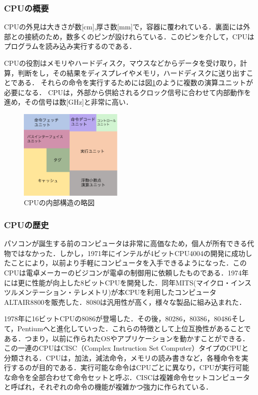 \documentclass[a4j,12pt]{jsarticle}
\begin{document}
\subsubsection{CPUの概要}
CPUの外見は大きさが数[cm],厚さ数[mm]で，容器に覆われている．裏面には外部との接続のため，数多くのピンが設けれらている．このピンを介して，CPUはプログラムを読み込み実行するのである．

CPUの役割はメモリやハードディスク，マウスなどからデータを受け取り，計算，判断をし，その結果をディスプレイやメモリ，ハードディスクに送り出すことである．
それらの命令を実行するためには図\ref{fig:cpu}のように複数の演算ユニットが必要になる．
CPUは，外部から供給されるクロック信号に合わせて内部動作を進め，その信号は数[GHz]と非常に高い．

\begin{figure}[htbp]
 \begin{center}
  \includegraphics[width=50mm]{CPU.pdf}
 \end{center}
 \caption{CPUの内部構造の略図}
 \label{fig:cpu}
\end{figure}

\subsubsection{CPUの歴史}
パソコンが誕生する前のコンピュータは非常に高価なため，個人が所有できる代物ではなかった．しかし，1971年にインテルが4ビットCPU4004の開発に成功したことにより，以前より手軽にコンピュータを入手できるようになった．このCPUは電卓メーカーのビジコンが電卓の制御用に依頼したものである．1974年には更に性能が向上した8ビットCPUを開発した．同年MITS(マイクロ・インスツルメンテーション・テレメトリ)が本CPUを利用したコンピュータALTAIR8800を販売した．8080は汎用性が高く，様々な製品に組み込まれた．

1978年に16ビットCPUの8086が登場した．その後，80286，80386，80486そして，Pentiumへと進化していった．これらの特徴として上位互換性があることである．つまり，以前に作られたOSやアプリケーションを動かすことができる．この一連のCPUはCISC（Complex Instruction Set Computer）タイプのCPUと分類される．CPUは，加法，減法命令，メモリの読み書きなど，各種命令を実行するのが目的である．実行可能な命令はCPUごとに異なり，CPUが実行可能な命令を全部合わせて命令セットと呼ぶ．CISCは複雑命令セットコンピュータと呼ばれ，それぞれの命令の機能が複雑かつ強力に作られている．
\end{document}
